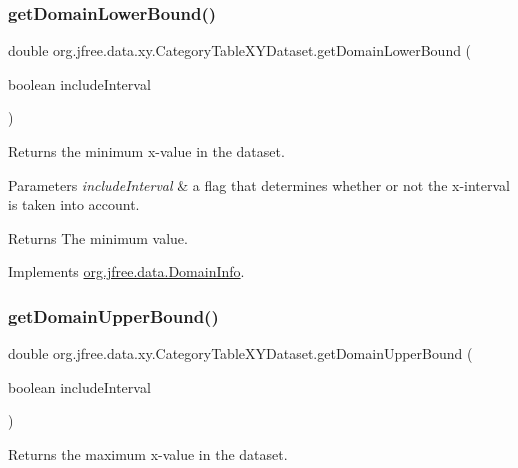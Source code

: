 \subsubsection{\texorpdfstring{get\+Domain\+Lower\+Bound()}{getDomainLowerBound()}}
{\footnotesize\ttfamily double org.\+jfree.\+data.\+xy.\+Category\+Table\+X\+Y\+Dataset.\+get\+Domain\+Lower\+Bound (\begin{DoxyParamCaption}\item[{boolean}]{include\+Interval }\end{DoxyParamCaption})}

Returns the minimum x-\/value in the dataset.


\begin{DoxyParams}{Parameters}
{\em include\+Interval} & a flag that determines whether or not the x-\/interval is taken into account.\\
\hline
\end{DoxyParams}
\begin{DoxyReturn}{Returns}
The minimum value. 
\end{DoxyReturn}


Implements \mbox{\hyperlink{interfaceorg_1_1jfree_1_1data_1_1_domain_info_ae1b4d9d415fe0a79bd2ce0f6e0a3f489}{org.\+jfree.\+data.\+Domain\+Info}}.

\mbox{\label{classorg_1_1jfree_1_1data_1_1xy_1_1_category_table_x_y_dataset_a9b3fb26c625c5e1d04b30277f993edc1}} 
\subsubsection{\texorpdfstring{get\+Domain\+Upper\+Bound()}{getDomainUpperBound()}}
{\footnotesize\ttfamily double org.\+jfree.\+data.\+xy.\+Category\+Table\+X\+Y\+Dataset.\+get\+Domain\+Upper\+Bound (\begin{DoxyParamCaption}\item[{boolean}]{include\+Interval }\end{DoxyParamCaption})}

Returns the maximum x-\/value in the dataset.


